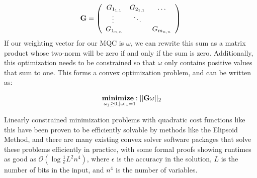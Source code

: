 \documentclass[aps,nofootinbib,pra,notitlepage,twocolumn]{revtex4-1}
\begin{document}
\begin{equation}\label{eq:vectorized_hamiltonians}
	\bold{G} = \left(\begin{array}{cccc}
		G_{1_{1,1}} & G_{2_{1,1}} & \ldots   \\ 
		\vdots\ & \ddots &    \\
		G_{1_{n,n}} &  &  G_{m_{n,n}} \\ 
	\end{array} 	
	\right)
\end{equation}
If our weighting vector for our MQC is $\omega$, we can rewrite this sum as a matrix product whose two-norm will be zero if and only if the sum is zero. Additionally, this optimization needs to be constrained so that $\omega$ only contains positive values that sum to one. This forms a convex optimization problem, and can be written as:

\begin{equation}\label{eq:minimization}
  \begin{split}
    &\underset{\omega_j\geq0, |\omega|_1=1}{\textbf{minimize}: } ||\bold{G}\omega||_2\\
  \end{split}
\end{equation}

Linearly constrained minimization problems with quadratic cost functions like this have been proven to be efficiently solvable by methods like the Elipsoid Method\cite{wright1999numerical, khachiyan}, and there are many existing convex solver software packages that solve these problems efficiently in practice, with some formal proofs showing runtimes as good as $\mathcal{O}(\log{\frac{1}{\epsilon}}L^2n^4)$, where $\epsilon$ is the accuracy in the solution, $L$ is the number of bits in the input, and $n^4$ is the number of variables.


\end{document}
